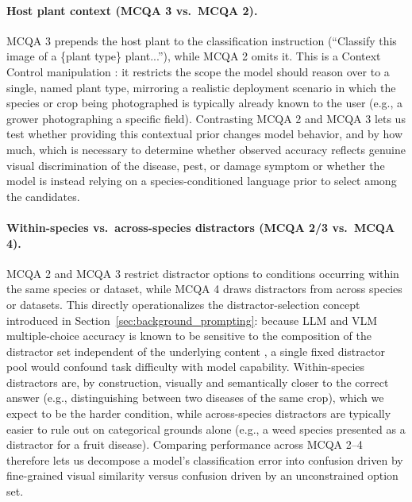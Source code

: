 \documentclass[10pt,letterpaper]{article}
\begin{document}
\paragraph{Host plant context (MCQA 3 vs.\ MCQA 2).} MCQA 3 prepends the host plant to the classification instruction (``Classify this image of a \{plant type\} plant...''), while MCQA 2 omits it. This is a Context Control manipulation \cite{white_prompt_2023}: it restricts the scope the model should reason over to a single, named plant type, mirroring a realistic deployment scenario in which the species or crop being photographed is typically already known to the user (e.g., a grower photographing a specific field). Contrasting MCQA 2 and MCQA 3 lets us test whether providing this contextual prior changes model behavior, and by how much, which is necessary to determine whether observed accuracy reflects genuine visual discrimination of the disease, pest, or damage symptom or whether the model is instead relying on a species-conditioned language prior to select among the candidates.

\paragraph{Within-species vs.\ across-species distractors (MCQA 2/3 vs.\ MCQA 4).} MCQA 2 and MCQA 3 restrict distractor options to conditions occurring within the same species or dataset, while MCQA 4 draws distractors from across species or datasets. This directly operationalizes the distractor-selection concept introduced in Section~\ref{sec:background_prompting}: because LLM and VLM multiple-choice accuracy is known to be sensitive to the composition of the distractor set independent of the underlying content \cite{pezeshkpour_large_2023}, a single fixed distractor pool would confound task difficulty with model capability. Within-species distractors are, by construction, visually and semantically closer to the correct answer (e.g., distinguishing between two diseases of the same crop), which we expect to be the harder condition, while across-species distractors are typically easier to rule out on categorical grounds alone (e.g., a weed species presented as a distractor for a fruit disease). Comparing performance across MCQA 2--4 therefore lets us decompose a model's classification error into confusion driven by fine-grained visual similarity versus confusion driven by an unconstrained option set.
\end{document}
